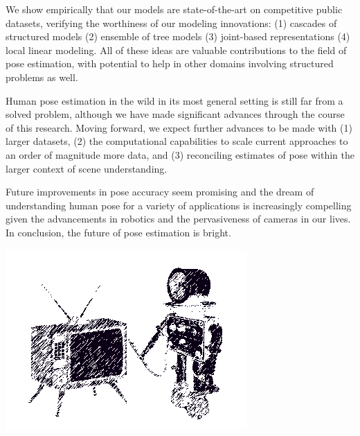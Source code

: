 We show empirically that our models are state-of-the-art on competitive public 
datasets, verifying the worthiness of our modeling innovations: (1) cascades of 
structured models (2) ensemble of tree models (3) joint-based representations 
(4) local linear modeling.  All of these ideas are valuable contributions to 
the field of pose estimation, with potential to help in other domains involving 
structured problems as well.

Human pose estimation in the wild in its most general setting is still far from 
a solved problem, although we have made significant advances through the course 
of this research.  Moving forward, we expect further advances to be made with 
(1) larger datasets, (2) the computational capabilities to scale current 
approaches to an order of magnitude more data, and (3) reconciling estimates of 
pose within the larger context of scene understanding.

Future improvements in pose accuracy seem promising and the dream of 
understanding human pose for a variety of applications is increasingly 
compelling given the advancements in robotics and the pervasiveness of cameras 
in our lives.  In conclusion, the future of pose estimation is bright.

\clearpage
\text{ } \vspace{3in}

\begin{center}
\includegraphics[width=0.350\linewidth]{figs/bot-tv.png}
\end{center}


